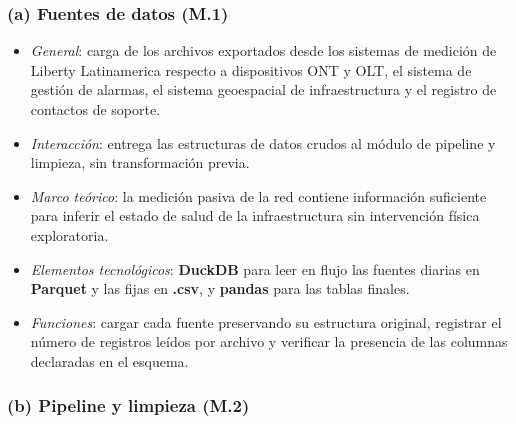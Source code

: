 \documentclass[12pt,a4paper]{article}
\begin{document}
\subsubsection*{(a) Fuentes de datos (M.1)}
 
\begin{itemize}
    \item \textit{General}: carga de los archivos exportados desde los sistemas de medición de Liberty Latinamerica respecto a dispositivos ONT y OLT, el sistema de gestión de alarmas, el sistema geoespacial de infraestructura y el registro de contactos de soporte.
    \item \textit{Interacción}: entrega las estructuras de datos crudos al módulo de pipeline y limpieza, sin transformación previa.
    \item \textit{Marco teórico}: la medición pasiva de la red contiene información suficiente para inferir el estado de salud de la infraestructura sin intervención física exploratoria.
    \item \textit{Elementos tecnológicos}: \textbf{DuckDB} para leer en flujo las fuentes diarias en \textbf{Parquet} y las fijas en \textbf{.csv}, y \textbf{pandas} para las tablas finales.
    \item \textit{Funciones}: cargar cada fuente preservando su estructura original, registrar el número de registros leídos por archivo y verificar la presencia de las columnas declaradas en el esquema.
\end{itemize}


\subsubsection*{(b) Pipeline y limpieza (M.2)}
 
\end{document}
